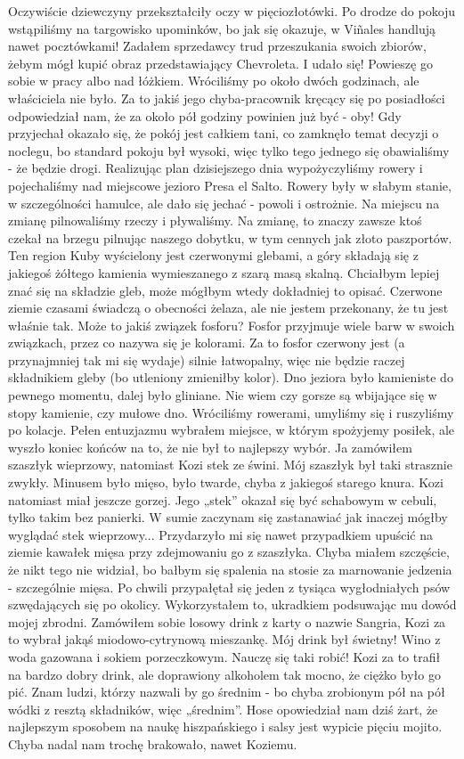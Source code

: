 \noindent Oczywiście dziewczyny przekształciły oczy w pięciozłotówki.
Po drodze do pokoju wstąpiliśmy na targowisko upominków, bo jak się okazuje, w Viñales handlują nawet pocztówkami!
Zadałem sprzedawcy trud przeszukania swoich zbiorów, żebym mógł kupić obraz przedstawiający Chevroleta.
I udało się!
Powieszę go sobie w pracy albo nad łóżkiem.
Wróciliśmy po około dwóch godzinach, ale właściciela nie było.
Za to jakiś jego chyba-pracownik kręcący się po posiadłości odpowiedział nam, że za około pół godziny powinien już być - oby!
Gdy przyjechał okazało się, że pokój jest całkiem tani, co zamknęło temat decyzji o noclegu, bo standard pokoju był wysoki, więc tylko tego jednego się obawialiśmy - że będzie drogi.
Realizując plan dzisiejszego dnia wypożyczyliśmy rowery i pojechaliśmy nad miejscowe jezioro Presa el Salto.
Rowery były w słabym stanie, w szczególności hamulce, ale dało się jechać - powoli i ostrożnie.
Na miejscu na zmianę pilnowaliśmy rzeczy i pływaliśmy.
Na zmianę, to znaczy zawsze ktoś czekał na brzegu pilnując naszego dobytku, w tym cennych jak złoto paszportów.
Ten region Kuby wyścielony jest czerwonymi glebami, a góry składają się z jakiegoś żółtego kamienia wymieszanego z szarą masą skalną.
Chciałbym lepiej znać się na składzie gleb, może mógłbym wtedy dokładniej to opisać.
Czerwone ziemie czasami świadczą o obecności żelaza, ale nie jestem przekonany, że tu jest właśnie tak.
Może to jakiś związek fosforu?
Fosfor przyjmuje wiele barw w swoich związkach, przez co nazywa się je kolorami.
Za to fosfor czerwony jest (a przynajmniej tak mi się wydaje) silnie łatwopalny, więc nie będzie raczej składnikiem gleby (bo utleniony zmieniłby kolor).
Dno jeziora było kamieniste do pewnego momentu, dalej było gliniane.
Nie wiem czy gorsze są wbijające się w stopy kamienie, czy mułowe dno.
Wróciliśmy rowerami, umyliśmy się i ruszyliśmy po kolacje.
Pełen entuzjazmu wybrałem miejsce, w którym spożyjemy posiłek, ale wyszło koniec końców na to, że nie był to najlepszy wybór.
Ja zamówiłem szaszłyk wieprzowy, natomiast Kozi stek ze świni.
Mój szaszłyk był taki strasznie zwykły.
Minusem było mięso, było twarde, chyba z jakiegoś starego knura.
Kozi natomiast miał jeszcze gorzej.
Jego „stek” okazał się być schabowym w cebuli, tylko takim bez panierki.
W sumie zaczynam się zastanawiać jak inaczej mógłby wyglądać stek wieprzowy...
Przydarzyło mi się nawet przypadkiem upuścić na ziemie kawałek mięsa przy zdejmowaniu go z szaszłyka.
Chyba miałem szczęście, że nikt tego nie widział, bo bałbym się spalenia na stosie za marnowanie jedzenia - szczególnie mięsa.
Po chwili przypałętał się jeden z tysiąca wygłodniałych psów szwędających się po okolicy.
Wykorzystałem to, ukradkiem podsuwając mu dowód mojej zbrodni.
Zamówiłem sobie losowy drink z karty o nazwie Sangria, Kozi za to wybrał jakąś miodowo-cytrynową mieszankę.
Mój drink był świetny!
Wino z woda gazowana i sokiem porzeczkowym.
Nauczę się taki robić!
Kozi za to trafił na bardzo dobry drink, ale doprawiony alkoholem tak mocno, że ciężko było go pić.
Znam ludzi, którzy nazwali by go średnim - bo chyba zrobionym pół na pół wódki z resztą składników, więc „średnim”.
Hose opowiedział nam dziś żart, że najlepszym sposobem na naukę hiszpańskiego i salsy jest wypicie pięciu mojito.
Chyba nadal nam trochę brakowało, nawet Koziemu.